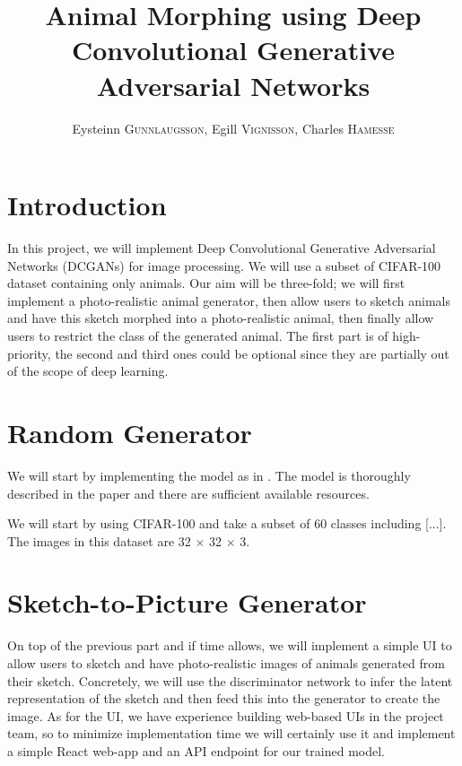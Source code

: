 \documentclass[a4paper]{article}
\title{Animal Morphing using Deep Convolutional Generative Adversarial Networks}
\author{
	Eysteinn \textsc{Gunnlaugsson},
	Egill \textsc{Vignisson},
	Charles \textsc{Hamesse}
}
\begin{document}
\maketitle


\section{Introduction}
In this project, we will implement Deep Convolutional Generative Adversarial Networks (DCGANs)  \cite{DBLP:journals/corr/RadfordMC15} for image processing. We will use a subset of CIFAR-100 dataset containing only animals. Our aim will be three-fold; we will first implement a photo-realistic animal generator, then allow users to sketch animals and have this sketch morphed into a photo-realistic animal, then finally allow users to restrict the class of the generated animal. The first part is of high-priority, the second and third ones could be optional since they are partially out of the scope of deep learning.


%
%
%
\section{Random Generator}
We will start by implementing the model as in \cite{DBLP:journals/corr/RadfordMC15}. The model is thoroughly described in the paper and there are sufficient available resources.

We will start by using CIFAR-100 and take a subset of 60 classes including [...]. The images in this dataset are 32 $\times$ 32 $\times$ 3.



%
%
%
\section{Sketch-to-Picture Generator}

On top of the previous part and if time allows, we will implement a simple UI to allow users to sketch and have photo-realistic images of animals generated from their sketch. Concretely, we will use the discriminator network to infer the latent representation of the sketch and then feed this into the generator to create the image. As for the UI, we have experience building web-based UIs in the project team, so to minimize implementation time we will certainly use it and implement a simple React web-app and an API endpoint for our trained model.  
\end{document}
